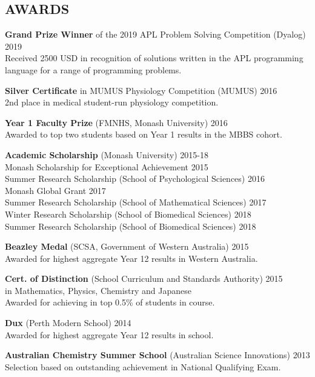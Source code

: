 \documentclass[margin]{res}
\begin{document}
\begin{resume}
\section{AWARDS}

{\bf Grand Prize Winner} of the 2019 APL Problem Solving Competition (Dyalog)
\hfill 2019\\
{\small Received 2500 USD in recognition of solutions written in the APL programming language for a range of programming problems.}

{\bf Silver Certificate} in MUMUS Physiology Competition (MUMUS)
\hfill 2016\\
{\small 2nd place in medical student-run physiology competition.}

{\bf Year 1 Faculty Prize} (FMNHS, Monash University) \hfill 2016 \\
{\small Awarded to top two students based on Year 1 results in the MBBS cohort.}

{\bf Academic Scholarship} (Monash University) \hfill 2015-18 \\
{\small Monash Scholarship for Exceptional Achievement \hfill 2015}\\
{\small Summer Research Scholarship (School of Psychological Sciences) \hfill 2016}\\
{\small Monash Global Grant \hfill 2017}\\
{\small Summer Research Scholarship (School of Mathematical Sciences) \hfill
  2017}\\
{\small Winter Research Scholarship (School of Biomedical Sciences) \hfill 2018}\\
{\small Summer Research Scholarship (School of Biomedical Sciences) \hfill 2018}

{\bf Beazley Medal} (SCSA, Government of Western Australia) \hfill 2015 \\
{\small Awarded for highest aggregate Year 12 results in Western
  Australia.}

{\bf Cert. of Distinction} (School Curriculum and Standards Authority) \hfill 2015\\
in Mathematics, Physics, Chemistry and Japanese\\
{\small Awarded for achieving in top 0.5\% of students in course.}

{\bf Dux} (Perth Modern School) \hfill 2014\\
{\small Awarded for highest aggregate Year 12 results in school.}

{\bf Australian Chemistry Summer School} (Australian
Science Innovations) \hfill 2013\\
{\small Selection based on outstanding achievement in National
  Qualifying Exam.}


\end{resume}
\end{document}
